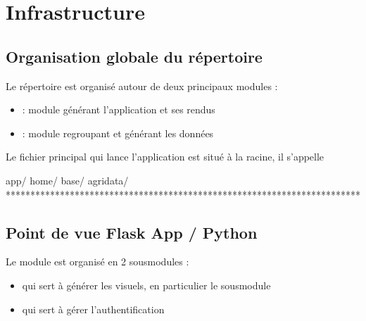 \documentclass[letterpaper,10pt,french]{sphinxmanual}
\begin{document}
\section{Infrastructure}
\label{\detokenize{infrastructure:infrastructure}}\label{\detokenize{infrastructure::doc}}

\subsection{Organisation globale du répertoire}
\label{\detokenize{infrastructure:organisation-globale-du-repertoire}}
\sphinxAtStartPar
Le répertoire est organisé autour de deux principaux modules :
\begin{itemize}
\item {} 
\sphinxAtStartPar
{} : module générant l’application et ses rendus

\item {} 
\sphinxAtStartPar
{} : module regroupant et générant les données

\end{itemize}

\sphinxAtStartPar
Le fichier principal qui lance l’application est situé à la racine, il s’appelle 

\begin{sphinxVerbatim}[commandchars=\\\{\}]
\PYGZhy{}\PYGZhy{} app/                                      
    \PYGZhy{}\PYGZhy{} home/                                
    \PYGZhy{}\PYGZhy{} base/                                
\PYGZhy{}\PYGZhy{} agri\PYGZus{}data/                                
\PYGZhy{}\PYGZhy{} ************************************************************************
\end{sphinxVerbatim}


\subsection{Point de vue Flask App / Python}
\label{\detokenize{infrastructure:point-de-vue-flask-app-python}}
\sphinxAtStartPar
Le module  est organisé en 2 sous\sphinxhyphen{}modules :
\begin{itemize}
\item {} 
\sphinxAtStartPar
{} qui sert à générer les visuels, en particulier le sous\sphinxhyphen{}module 

\item {} 
\sphinxAtStartPar
{} qui sert à gérer l’authentification

\end{itemize}
\end{document}
